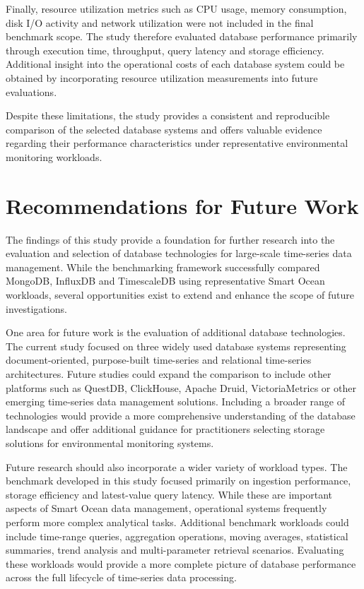 Finally, resource utilization metrics such as CPU usage, memory consumption, disk I/O activity and network utilization were not included in the final benchmark scope. The study therefore evaluated database performance primarily through execution time, throughput, query latency and storage efficiency. Additional insight into the operational costs of each database system could be obtained by incorporating resource utilization measurements into future evaluations.


Despite these limitations, the study provides a consistent and reproducible comparison of the selected database systems and offers valuable evidence regarding their performance characteristics under representative environmental monitoring workloads.



\section{Recommendations for Future Work}
The findings of this study provide a foundation for further research into the evaluation and selection of database technologies for large-scale time-series data management. While the benchmarking framework successfully compared MongoDB, InfluxDB and TimescaleDB using representative Smart Ocean workloads, several opportunities exist to extend and enhance the scope of future investigations.


One area for future work is the evaluation of additional database technologies. The current study focused on three widely used database systems representing document-oriented, purpose-built time-series and relational time-series architectures. Future studies could expand the comparison to include other platforms such as QuestDB, ClickHouse, Apache Druid, VictoriaMetrics or other emerging time-series data management solutions. Including a broader range of technologies would provide a more comprehensive understanding of the database landscape and offer additional guidance for practitioners selecting storage solutions for environmental monitoring systems.


Future research should also incorporate a wider variety of workload types. The benchmark developed in this study focused primarily on ingestion performance, storage efficiency and latest-value query latency. While these are important aspects of Smart Ocean data management, operational systems frequently perform more complex analytical tasks. Additional benchmark workloads could include time-range queries, aggregation operations, moving averages, statistical summaries, trend analysis and multi-parameter retrieval scenarios. Evaluating these workloads would provide a more complete picture of database performance across the full lifecycle of time-series data processing.


